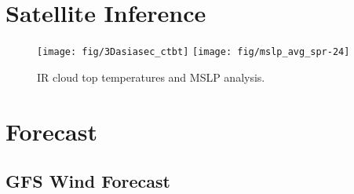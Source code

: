 \documentclass[12pt,a4paper]{article} %
\begin{document}



\section{Satellite Inference}
\begin{figure}[H]
\centering
\texttt{[image: fig/3Dasiasec\_ctbt]}
\texttt{[image: fig/mslp\_avg\_spr-24]}
\caption{IR cloud top temperatures and MSLP analysis.}
\end{figure}






\section{Forecast}



\subsection*{GFS Wind Forecast}
\end{document}
